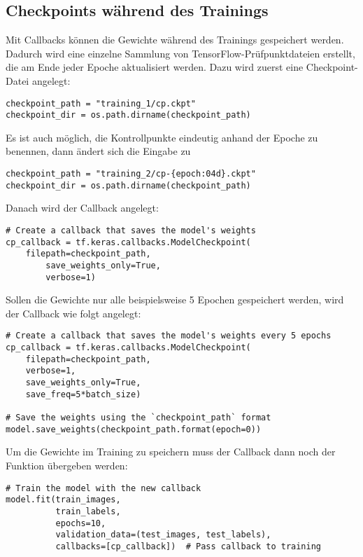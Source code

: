\subsection{Checkpoints während des Trainings}

Mit Callbacks können die Gewichte während des Trainings gespeichert werden. 
Dadurch wird eine einzelne Sammlung von TensorFlow-Prüfpunktdateien erstellt, die am Ende jeder Epoche aktualisiert werden.
Dazu wird zuerst eine Checkpoint-Datei angelegt:

\begin{verbatim}
checkpoint_path = "training_1/cp.ckpt"
checkpoint_dir = os.path.dirname(checkpoint_path)
\end{verbatim}

Es ist auch möglich, die Kontrollpunkte eindeutig anhand der Epoche zu benennen, dann ändert sich die Eingabe zu

\begin{verbatim}
checkpoint_path = "training_2/cp-{epoch:04d}.ckpt"
checkpoint_dir = os.path.dirname(checkpoint_path)
\end{verbatim}

Danach wird der Callback angelegt: 
\begin{verbatim}
# Create a callback that saves the model's weights
cp_callback = tf.keras.callbacks.ModelCheckpoint(
	filepath=checkpoint_path,
		save_weights_only=True,
		verbose=1)
\end{verbatim}

Sollen die Gewichte nur alle beispielsweise 5 Epochen gespeichert werden, wird der Callback wie folgt angelegt:
\begin{verbatim}
# Create a callback that saves the model's weights every 5 epochs
cp_callback = tf.keras.callbacks.ModelCheckpoint(
    filepath=checkpoint_path, 
    verbose=1, 
    save_weights_only=True,
    save_freq=5*batch_size)

# Save the weights using the `checkpoint_path` format
model.save_weights(checkpoint_path.format(epoch=0))
\end{verbatim}

Um die Gewichte im Training zu speichern muss der Callback dann
noch der Funktion  übergeben werden:

\begin{verbatim}
# Train the model with the new callback
model.fit(train_images, 
          train_labels,  
          epochs=10,
          validation_data=(test_images, test_labels),
          callbacks=[cp_callback])  # Pass callback to training
\end{verbatim}

